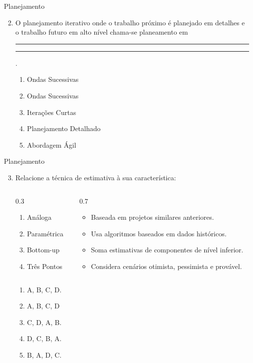 \documentclass{beamer}
\begin{document}
\begin{frame}{Planejamento}
	\begin{enumerate}
		\setcounter{enumi}{1}
		\justifying
		\item O planejamento iterativo onde o trabalho próximo é planejado em detalhes e o trabalho futuro em alto nível chama-se planeamento em \rule{60pt}{1pt} \rule{60pt}{1pt}.
		\begin{enumerate}[a]
			\item Ondas Sucessivas
			\item \alert<2>{Ondas Sucessivas}
			\item Iterações Curtas
			\item Planejamento Detalhado
			\item Abordagem Ágil
		\end{enumerate}
	\end{enumerate}
\end{frame}

\begin{frame}{Planejamento}
	\begin{enumerate}
		\setcounter{enumi}{2}
		\justifying
		\item Relacione a técnica de estimativa à sua característica:
		\begin{columns}
			\begin{column}{0.3\textwidth}
				\begin{enumerate}[A]
					\item Análoga
					\item Paramétrica
					\item Bottom-up
					\item Três Pontos
				\end{enumerate}
			\end{column}
			\begin{column}{0.7\textwidth}
				\begin{itemize}
					\item Baseada em projetos similares anteriores.
					\item Usa algoritmos baseados em dados históricos.
					\item Soma estimativas de componentes de nível inferior.
					\item Considera cenários otimista, pessimista e provável.
				\end{itemize}
			\end{column}
		\end{columns}
		\begin{enumerate}[a]
			\item A, B, C, D.
			\item \alert<2>{A, B, C, D}
			\item C, D, A, B.
			\item D, C, B, A.
			\item B, A, D, C.
		\end{enumerate}
	\end{enumerate}
\end{frame}
\end{document}
